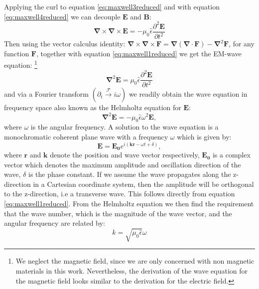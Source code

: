 Applying the curl to equation \ref{eq:maxwell3reduced} and with equation \ref{eq:maxwell4reduced} we can decouple $\bm{E}$ and $\bm{B}$: 
\begin{equation}
    \bm{\nabla}\times \bm{\nabla}\times \bm{E} = -\mu_0 \hat{\epsilon} \frac{\partial^2\bm{E}}{\partial t^2}
\end{equation}
Then using the vector calculus identity: $\bm{\nabla}\times \bm{\nabla}\times \bm{F} = \bm{\nabla} \left( \bm{\nabla} \cdot \bm{F} \right) - \bm{\nabla}^2 \bm{F}$, for any function $\bm{F}$, together with equation \ref{eq:maxwell1reduced} we get the EM-wave equation: \footnote{We neglect the magnetic field, since we are only concerned with non magnetic materials in this work. Nevertheless, the derivation of the wave equation for the magnetic field looks similar to the derivation for the electric field.}
\begin{equation}
    \label{eq:waveeq}
    \bm{\nabla}^2 \bm{E} = \mu_0 \hat{\epsilon} \frac{\partial^2\bm{E}}{\partial t^2}
\end{equation}
and via a Fourier transform $(\partial_t \xrightarrow{\mathscr{F}} i\omega)$ we readily obtain the wave equation in frequency space also known as the Helmholtz equation for $\bm{E}$:
\begin{equation}
    \label{eq:waveeqfreq}
    \bm{\nabla}^2 \bm{E} = -\mu_0 \hat{\epsilon} \omega^2 \bm{E},
\end{equation}
where $\omega$ is the angular frequency.
A solution to the wave equation is a monochromatic coherent plane wave with a frequency $\omega$ which is given by: 
\begin{equation}
    \label{eq:planewave}
    \bm{E} = \bm{E_0} e^{i(\bm{k}\bm{r} - \omega t + \delta)},
\end{equation}
where $\bm{r}$ and $\bm{k}$ denote the position and wave vector respectively, $\bm{E_0}$ is a complex vector which denotes the maximum amplitude and oscillation direction of the wave, $\delta$ is the phase constant. If we assume the wave propagates along the z-direction in a Cartesian coordinate system, then the amplitude will be orthogonal to the z-direction, i.e a transverse wave. This follows directly from equation \ref{eq:maxwell1reduced}. From the Helmholtz equation we then find the requirement that the wave number, which is the magnitude of the wave vector, and the angular frequency are related by:
\begin{equation}
    \label{eq:wavevector_req}
    k = \sqrt{\mu_0 \hat{\epsilon}} \omega
\end{equation}
